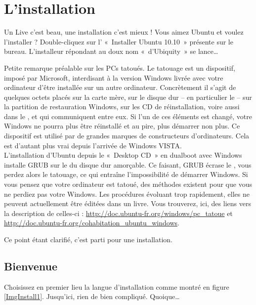 \section{L'installation}
\label{RefInstall}
Un Live c'est beau, une installation c'est mieux ! Vous aimez Ubuntu et voulez l'installer ? Double-cliquez sur l' «~Installer Ubuntu 10.10~» présente sur le bureau. L'installeur répondant au doux nom «~d'Ubiquity~» se lance\ldots{}
\begin{attention}
Petite remarque préalable sur les PCs tatoués.\label{RefTatouage}
Le tatouage est un dispositif, imposé par Microsoft, interdisant à la version Windows livrée avec votre ordinateur d'être installée sur un autre ordinateur. Concrètement il s'agit de quelques octets placés sur la carte mère, sur le disque dur -- en particulier le -- sur la partition de restauration Windows, sur les CD de réinstallation, voire aussi dans le , et qui communiquent entre eux. Si l'un de ces éléments est changé, votre Windows ne pourra plus être réinstallé et au pire, plus démarrer non plus. Ce dispositif est utilisé par de grandes marques de constructeurs d'ordinateurs. Cela est d'autant plus vrai depuis l'arrivée de Windows VISTA.\\
L'installation d'Ubuntu depuis le «~Desktop CD~» en dualboot avec Windows installe GRUB sur le  du disque dur amorçable. Ce faisant, GRUB écrase le , vous perdez alors le tatouage, ce qui entraîne l'impossibilité de démarrer Windows. Si vous pensez que votre ordinateur est tatoué, des méthodes existent pour que vous ne perdiez pas votre Windows. Les procédures évoluant trop rapidement, elles ne peuvent actuellement être éditées dans un livre. Vous trouverez, ici, des liens vers la description de celles-ci : \url{http://doc.ubuntu-fr.org/windows/pc_tatoue} et \url{http://doc.ubuntu-fr.org/cohabitation_ubuntu_windows}.
\end{attention}\par
Ce point étant clarifié, c'est parti pour une installation.
\subsection{Bienvenue}
Choisissez en premier lieu la langue d'installation comme montré en figure \ref{ImgInstall1}. Jusqu'ici, rien de bien compliqué. Quoique\ldots{}
